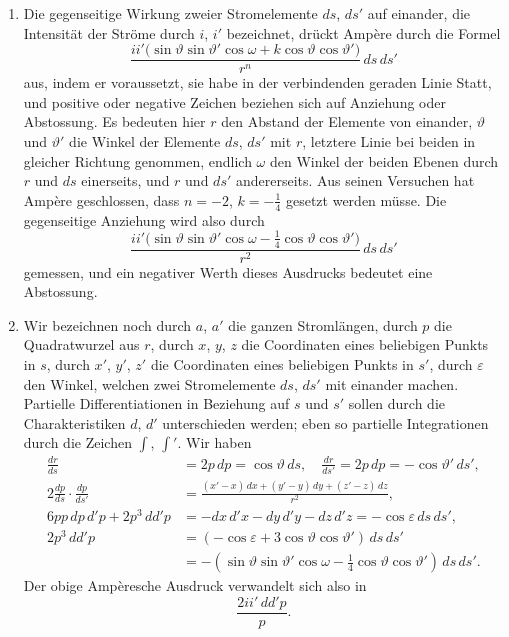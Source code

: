 \documentclass[fontsize=10pt,paper=a5,pagesize=auto]{scrbook}
\begin{document}
\begin{enumerate}[label=\arabic*.]
\item Die gegenseitige Wirkung zweier Stromelemente $ds$, $ds'$ auf einander, die Intensität der Ströme durch $i$, $i'$ bezeichnet, drückt Ampère durch die Formel
\[
\frac{ii'\bigl(\sin\vartheta \sin\vartheta' \cos\omega + k \cos\vartheta \cos\vartheta'\bigr)}{r^n} \, ds \, ds'
\]
aus, indem er voraussetzt, sie habe in der verbindenden geraden Linie Statt, und positive oder negative Zeichen beziehen sich auf Anziehung oder Abstossung. Es bedeuten hier $r$ den Abstand der Elemente von einander, $\vartheta$ und $\vartheta'$ die Winkel der Elemente $ds$, $ds'$ mit $r$, letztere Linie bei beiden in gleicher Richtung genommen, endlich $\omega$ den Winkel der beiden Ebenen durch $r$ und $ds$ einerseits, und $r$ und $ds'$ andererseits. Aus seinen Versuchen hat Ampère geschlossen, dass $n = -2$, $k = -\tfrac{1}{4}$ gesetzt werden müsse. Die gegenseitige Anziehung wird also durch
\[
\frac{ii'\bigl(\sin\vartheta \sin\vartheta' \cos\omega - \tfrac{1}{4} \cos\vartheta \cos\vartheta'\bigr)}{r^2} \, ds \, ds'
\]
gemessen, und ein negativer Werth dieses Ausdrucks bedeutet eine Abstossung.

\item Wir bezeichnen noch durch $a$, $a'$ die ganzen Stromlängen, durch $p$ die Quadratwurzel aus $r$, durch $x$, $y$, $z$ die Coordinaten eines beliebigen Punkts in $s$, durch $x'$, $y'$, $z'$ die Coordinaten eines beliebigen Punkts in $s'$, durch $\varepsilon$ den Winkel, welchen zwei Stromelemente $ds$, $ds'$ mit einander machen. Partielle Differentiationen in Beziehung auf $s$ und $s'$ sollen durch die Charakteristiken $d$, $d'$ unterschieden werden; eben so partielle Integrationen durch die Zeichen $\int$, $\int'$. Wir haben
\begin{align*}
\frac{dr}{ds} &= 2p \, dp = \cos\vartheta \, ds, \quad \frac{dr}{ds'} = 2p \, dp = -\cos\vartheta' \, ds',\\
2 \frac{dp}{ds} \cdot \frac{dp}{ds'} &= \frac{(x' - x) \, dx + (y' - y) \, dy + (z' - z) \, dz}{r^2},\\
6pp \, dp \, d'p + 2p^3 \, dd'p &= -dx \, d'x - dy \, d'y - dz \, d'z = -\cos\varepsilon \, ds \, ds',\\
2p^3 \, dd'p &= (-\cos\varepsilon + 3\cos\vartheta \cos\vartheta') \, ds \, ds'\\
&= -(\sin\vartheta \sin\vartheta' \cos\omega - \tfrac{1}{4}\cos\vartheta \cos\vartheta') \, ds \, ds'.
\end{align*}
Der obige Ampèresche Ausdruck verwandelt sich also in
\[
\frac{2ii' \, dd'p}{p}.
\]
\end{enumerate}
\end{document}
